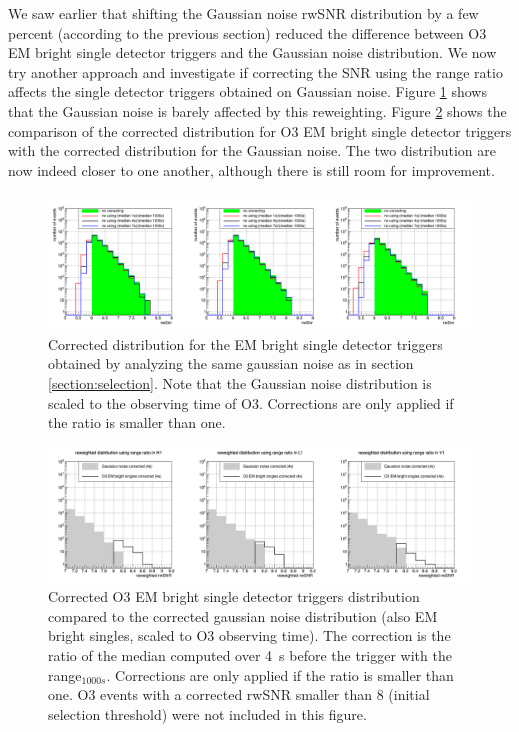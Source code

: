 We saw earlier that shifting the Gaussian noise rwSNR distribution by a few percent (according to the previous section) reduced the difference between O3 EM bright single detector triggers and the Gaussian noise distribution.
We now try another approach and investigate if correcting the SNR using the range ratio affects the single detector triggers obtained on Gaussian noise.
Figure \ref{fig:reweightGaus} shows that the Gaussian noise is barely affected by this reweighting.
Figure \ref{fig:reweightBrightGaus} shows the comparison of the corrected distribution for O3 EM bright single detector triggers with the corrected distribution for the Gaussian noise.
The two distribution are now indeed closer to one another, although there is still room for improvement.
\begin{figure}[H]
  \centering
  \includegraphics[width=\linewidth]{sectionBadTriggers/PSD/Reweight/cReweightGausBright.png}
  \caption{Corrected distribution for the EM bright single detector triggers obtained by analyzing the same gaussian noise as in section \ref{section:selection}. Note that the Gaussian noise distribution is scaled to the observing time of O3. Corrections are only applied if the ratio is smaller than one.}
  \label{fig:reweightGaus}
\end{figure}
%
\begin{figure}[H]
  \centering
  \includegraphics[width=\linewidth]{sectionBadTriggers/PSD/Reweight/cReweightBrightGaus.png}
  \caption{Corrected O3 EM bright single detector triggers distribution compared to the corrected gaussian noise distribution (also EM bright singles, scaled to O3 observing time). The correction is the ratio of the median computed over \SI{4}{s} before the trigger with the range$_{1000s}$. Corrections are only applied if the ratio is smaller than one. O3 events with a corrected rwSNR smaller than 8 (initial selection threshold) were not included in this figure.}
  \label{fig:reweightBrightGaus}
\end{figure}

